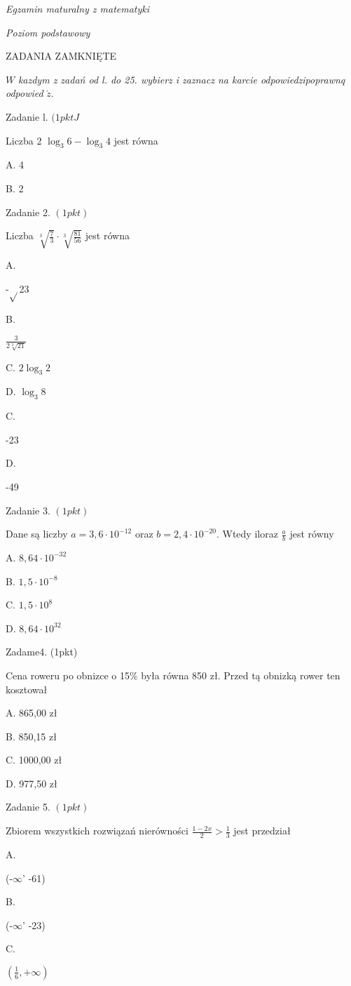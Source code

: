 \documentclass[a4paper,12pt]{article}
\begin{document}
{\it Egzamin maturalny z matematyki}

{\it Poziom podstawowy}

ZADANIA ZAMKNIĘTE

$W$ {\it kazdym z zadań od l. do 25. wybierz i zaznacz na karcie odpowiedzipoprawnq odpowied} $\acute{z}.$

Zadanie l. $(1pktJ$

Liczba 2 $\log_{3}6-\log_{3}4$ jest równa

A. 4

B. 2

Zadanie 2. $(1pkt)$

Liczba $\sqrt[3]{\frac{7}{3}}\cdot\sqrt[3]{\frac{81}{56}}$ jest równa

A.

-$\sqrt{}$23

B.

$\displaystyle \frac{3}{2\sqrt[3]{21}}$

C. $2\log_{3}2$

D. $\log_{3}8$

C.

-23

D.

-49

Zadanie 3. $(1pkt)$

Dane są liczby $a=3,6\cdot 10^{-12}$ oraz $b=2,4\cdot 10^{-20}$. Wtedy iloraz $\displaystyle \frac{a}{b}$ jest równy

A. $8,64\cdot 10^{-32}$

B. $1,5\cdot 10^{-8}$

C. $1,5\cdot 10^{8}$

D. $8,64\cdot 10^{32}$

Zadame4. (1pkt)

Cena roweru po obnizce o 15\% była równa 850 zł. Przed tą obnizką rower ten kosztował

A. 865,00 zł

B. 850,15 zł

C. 1000,00 zł

D. 977,50 zł

Zadanie 5. $(1pkt)$

Zbiorem wszystkich rozwiązań nierówności $\displaystyle \frac{1-2x}{2}>\frac{1}{3}$ jest przedział

A.

(-$\infty$' -61)

B.

(-$\infty$' -23)

C.

$(\displaystyle \frac{1}{6},+\infty)$
\end{document}

